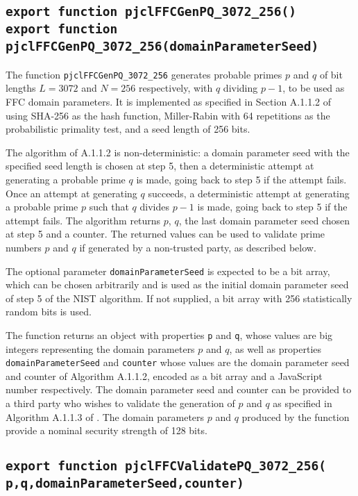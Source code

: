 \documentclass[12pt]{article}
\begin{document}
\subsection{\tt export function pjclFFCGenPQ\_3072\_256()\\export function pjclFFCGenPQ\_3072\_256(domainParameterSeed)}

The function {\tt pjclFFCGenPQ\_3072\_256} generates probable primes $p$ and $q$
of bit lengths $L = 3072$ and $N = 256$ respectively, with $q$
dividing $p-1$, to be used as FFC domain parameters.
It is implemented as specified in Section A.1.1.2 of \cite{DSS-4} using
SHA-256 as the hash function, Miller-Rabin with 64 repetitions as the
probabilistic primality test, and a seed length of 256 bits.

The algorithm of A.1.1.2 is non-deterministic: a domain parameter seed
with the specified seed length is chosen at step 5, then a
deterministic attempt at generating a probable prime $q$ is made,
going back to step 5 if the attempt fails.  Once an attempt at
generating $q$ succeeds, a deterministic attempt at generating a
probable prime $p$ such that $q$ divides $p-1$ is made, going back to
step 5 if the attempt fails.  The algorithm returns $p$, $q$, the last
domain parameter seed chosen at step 5 and a counter.  The returned
values can be used to validate prime numbers $p$
and $q$ if generated by a non-trusted party, as described below.

The optional parameter {\tt domainParameterSeed} is expected to be a bit array,
which can be chosen arbitrarily and is used as the initial domain
parameter seed of step 5 of the NIST algorithm.  
If not supplied, a bit array with 256 statistically random bits is used.

The function returns
an object with properties {\tt p} and {\tt q}, whose values are 
big integers representing the 
domain parameters $p$ and $q$, as well as properties {\tt domainParameterSeed}
and {\tt counter} whose values are the domain parameter seed and counter of
Algorithm A.1.1.2, encoded as a bit array and a JavaScript number
respectively.  The domain parameter seed and counter can be 
provided to a third party who wishes to validate the generation of 
$p$ and $q$ as specified in Algorithm A.1.1.3 of \cite{DSS-4}.
The domain parameters $p$ and $q$ produced by the function
provide a nominal security strength of 128 bits.

\subsection{\tt export function pjclFFCValidatePQ\_3072\_256(\\\mbox{}\hspace{.2in}p,q,domainParameterSeed,counter)}
\end{document}
